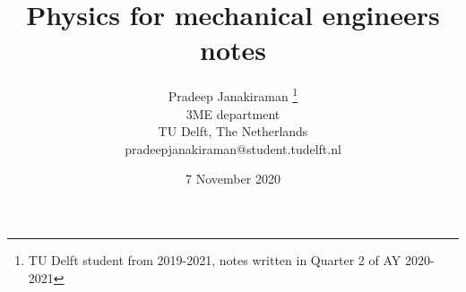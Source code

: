 \documentclass[a4paper, reqno, 12pt, openbib]{article} %
\begin{document}
\title{Physics for mechanical engineers notes}
\author{Pradeep Janakiraman \thanks{TU Delft student from 2019-2021, notes written in Quarter 2 of AY 2020-2021}\\
3ME department\\
TU Delft, The Netherlands\\
pradeepjanakiraman@student.tudelft.nl}
\date{7 November 2020}
\maketitle
\newpage
\tableofcontents
\newpage



\end{document}

